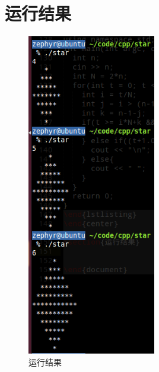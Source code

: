 \documentclass[11pt]{article}
\begin{document}
\section{运行结果}
\begin{figure}[htbp]
\centering
\includegraphics[width=0.5\textwidth]{star.png}
\caption{运行结果}
\label{fig: result}
\end{figure}
\end{document}
